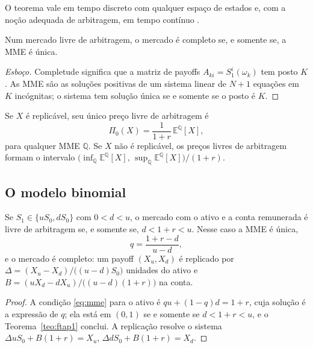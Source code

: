 O teorema vale em tempo discreto com qualquer espaço de estados \citep{dmw1990} e, com a noção adequada de arbitragem, em tempo contínuo \citep{harrisonpliska1981,delbaenschachermayer1994}.

\begin{teorema}
Num mercado livre de arbitragem, o mercado é completo se, e somente se, a MME é única.
\end{teorema}

\begin{proof}[Esboço]
Completude significa que a matriz de payoffs $A_{ki}=S^i_1(\omega_k)$ tem posto $K$. As MME são as soluções positivas de um sistema linear de $N+1$ equações em $K$ incógnitas; o sistema tem solução única se e somente se o posto é $K$.
\end{proof}

\begin{corolario}
Se $X$ é replicável, seu único preço livre de arbitragem é
\begin{equation}
\Pi_0(X)=\frac{1}{1+r}\,\mathbb E^{\mathbb Q}[X],
\end{equation}
para qualquer MME $\mathbb Q$. Se $X$ não é replicável, os preços livres de arbitragem formam o intervalo $\big(\inf_{\mathbb Q}\mathbb E^{\mathbb Q}[X],\,\sup_{\mathbb Q}\mathbb E^{\mathbb Q}[X]\big)/(1+r)$.
\end{corolario}

\subsection{O modelo binomial}

\begin{proposicao}\label{prop:binomial}
Se $S_1\in\{uS_0,dS_0\}$ com $0<d<u$, o mercado com o ativo e a conta remunerada é livre de arbitragem se, e somente se, $d<1+r<u$. Nesse caso a MME é única,
\begin{equation}
q=\frac{1+r-d}{u-d},
\end{equation}
e o mercado é completo: um payoff $(X_u,X_d)$ é replicado por $\Delta=(X_u-X_d)/\big((u-d)S_0\big)$ unidades do ativo e $B=(uX_d-dX_u)/\big((u-d)(1+r)\big)$ na conta.
\end{proposicao}

\begin{proof}
A condição \eqref{eq:mme} para o ativo é $qu+(1-q)d=1+r$, cuja solução é a expressão de $q$; ela está em $(0,1)$ se e somente se $d<1+r<u$, e o Teorema~\ref{teo:ftap1} conclui. A replicação resolve o sistema $\Delta uS_0+B(1+r)=X_u$, $\Delta dS_0+B(1+r)=X_d$.
\end{proof}

